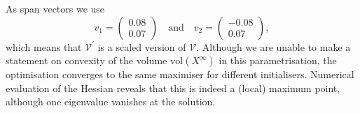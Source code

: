 \documentclass{ifacconf}
\providecommand{\vol}{\text{vol}}
\providecommand{\V}{\mathcal V}
\begin{document}
%
As span vectors we use 
\[
v_1 = \begin{pmatrix} 0.08 \\ 0.07\end{pmatrix} \quad \text{and}\quad 
v_2 = \begin{pmatrix}-0.08 \\ 0.07\end{pmatrix},
\] 
which means that $\V^\prime$ is a scaled version of $\V$.
%
Although we are unable to make a statement on convexity of the volume $\vol(X^\infty)$ in this parametrisation, the optimisation converges to the same maximiser for different initialisers. Numerical evaluation of the Hessian reveals that this is indeed a (local) maximum point, although one eigenvalue vanishes at the solution.
%
\end{document}
